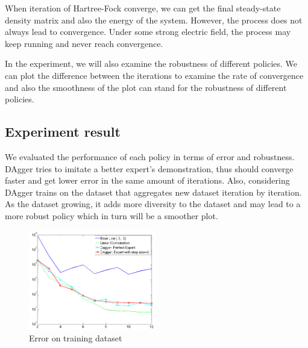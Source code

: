 \documentclass[twoside]{article}
\begin{document}

When iteration of Hartree-Fock converge, we can get the final steady-state density matrix and also the energy of the system. However, the process does not always lead to convergence. Under some strong electric field, the process may keep running and never reach convergence.

In the experiment, we will also examine the robustness of different policies.
We can plot the difference between the iterations to examine the rate of convergence and also the smoothness of the plot can stand for the robustness of different policies.





 


\subsection{Experiment result}


We evaluated the performance of each policy in terms of error and robustness. 
DAgger tries to imitate a better expert's demonstration, thus should converge faster and get lower error in the same amount of iterations. Also, considering DAgger trains on the dataset that aggregates new dataset iteration by iteration. As the dataset growing, it adds more diversity to the dataset and may lead to a more robust policy which in turn will be a smoother plot.


\begin{figure}[h!]
  \caption{Error on training dataset}
	\label{fig:training}
    \includegraphics[width=210px]{Dagger_beta05_training.jpg}
\end{figure}
\end{document}
